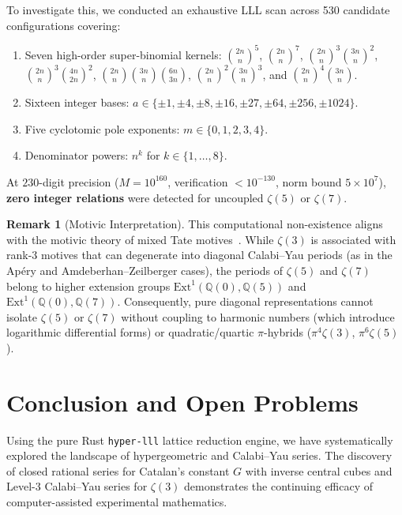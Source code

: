 \documentclass[11pt,a4paper]{article}
\theoremstyle{definition}
\newtheorem{remark}[theorem]{Remark}
\begin{document}
To investigate this, we conducted an exhaustive LLL scan across 530 candidate configurations covering:
\begin{enumerate}
    \item Seven high-order super-binomial kernels: $\binom{2n}{n}^5$, $\binom{2n}{n}^7$, $\binom{2n}{n}^3\binom{3n}{n}^2$, $\binom{2n}{n}^3\binom{4n}{2n}^2$, $\binom{2n}{n}\binom{3n}{n}\binom{6n}{3n}$, $\binom{2n}{n}^2\binom{3n}{n}^3$, and $\binom{2n}{n}^4\binom{3n}{n}$.
    \item Sixteen integer bases: $a \in \{\pm 1, \pm 4, \pm 8, \pm 16, \pm 27, \pm 64, \pm 256, \pm 1024\}$.
    \item Five cyclotomic pole exponents: $m \in \{0, 1, 2, 3, 4\}$.
    \item Denominator powers: $n^k$ for $k \in \{1, \dots, 8\}$.
\end{enumerate}
At $230$-digit precision ($M = 10^{160}$, verification $< 10^{-130}$, norm bound $5 \times 10^7$), \textbf{zero integer relations} were detected for uncoupled $\zeta(5)$ or $\zeta(7)$.

\begin{remark}[Motivic Interpretation]
This computational non-existence aligns with the motivic theory of mixed Tate motives~\cite{deligne2005}. While $\zeta(3)$ is associated with rank-3 motives that can degenerate into diagonal Calabi--Yau periods (as in the Ap\'ery and Amdeberhan--Zeilberger cases), the periods of $\zeta(5)$ and $\zeta(7)$ belong to higher extension groups $\text{Ext}^1(\mathbb{Q}(0), \mathbb{Q}(5))$ and $\text{Ext}^1(\mathbb{Q}(0), \mathbb{Q}(7))$. Consequently, pure diagonal representations cannot isolate $\zeta(5)$ or $\zeta(7)$ without coupling to harmonic numbers (which introduce logarithmic differential forms) or quadratic/quartic $\pi$-hybrids ($\pi^4\zeta(3)$, $\pi^6\zeta(5)$).
\end{remark}

\section{Conclusion and Open Problems}

Using the pure Rust \texttt{hyper-lll} lattice reduction engine, we have systematically explored the landscape of hypergeometric and Calabi--Yau series. The discovery of closed rational series for Catalan's constant $G$ with inverse central cubes and Level-3 Calabi--Yau series for $\zeta(3)$ demonstrates the continuing efficacy of computer-assisted experimental mathematics.
\end{document}
